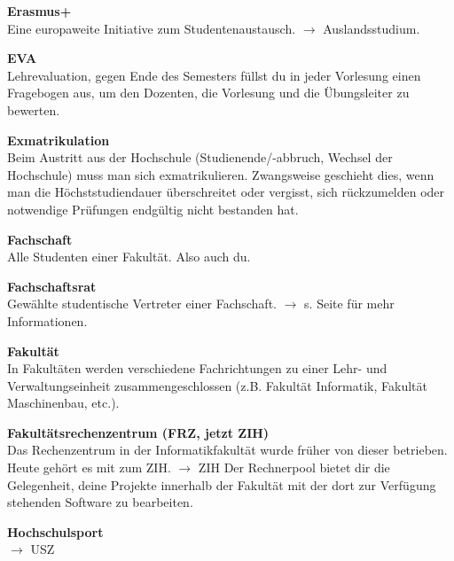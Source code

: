 \begin{multicols}{2}
\textbf{Erasmus+} \\
Eine europaweite Initiative zum Studentenaustausch.
$\rightarrow$ Auslandsstudium.

\textbf{EVA} \\
Lehrevaluation, gegen Ende des Semesters füllst du in jeder Vorlesung einen Fragebogen aus, um den Dozenten, die Vorlesung und die Übungsleiter zu bewerten.

\vfill\columnbreak

\textbf{Exmatrikulation} \\
Beim Austritt aus der Hochschule (Studienende/-abbruch, Wechsel der Hochschule) muss man sich exmatrikulieren.
Zwangsweise geschieht dies, wenn man die Höchststudiendauer überschreitet oder vergisst, sich rückzumelden oder notwendige Prüfungen endgültig nicht bestanden hat.

\textbf{Fachschaft} \\
Alle Studenten einer Fakultät. Also auch du.

\textbf{Fachschaftsrat} \\
Gewählte studentische Vertreter einer Fachschaft. $\rightarrow$ s. Seite \pageref{sec:fachschaftsrat} für mehr Informationen.


\textbf{Fakultät} \\
In Fakultäten werden verschiedene Fachrichtungen zu einer Lehr- und Verwaltungseinheit zusammengeschlossen (z.B. Fakultät Informatik, Fakultät Maschinenbau, etc.).

\textbf{Fakultätsrechenzentrum (FRZ, jetzt ZIH)} \\
Das Rechenzentrum in der Informatikfakultät wurde früher von dieser betrieben.
Heute gehört es mit zum ZIH. $\rightarrow$ ZIH
Der Rechnerpool bietet dir die Gelegenheit, deine Projekte innerhalb der Fakultät mit der dort zur Verfügung stehenden Software zu bearbeiten.

\textbf{Hochschulsport} \\
$\rightarrow$ USZ

\vfill\columnbreak


\end{multicols}

